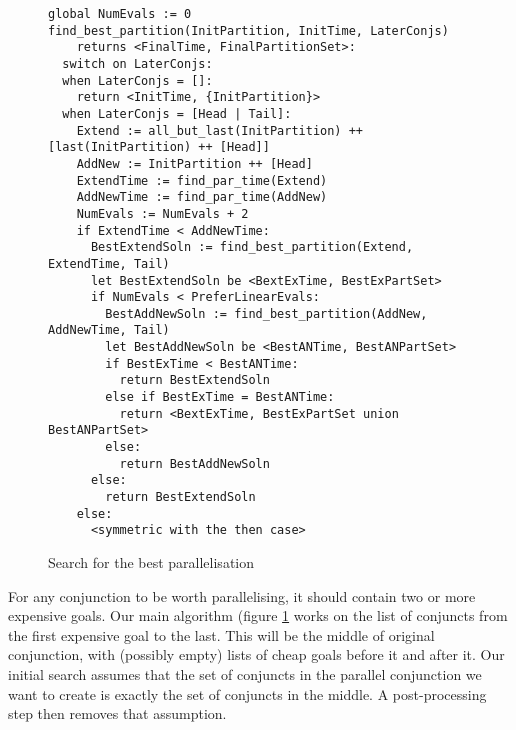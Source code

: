 \begin{figure}
\begin{center}
\begin{verbatim}
global NumEvals := 0
find_best_partition(InitPartition, InitTime, LaterConjs)
    returns <FinalTime, FinalPartitionSet>:
  switch on LaterConjs:
  when LaterConjs = []:
    return <InitTime, {InitPartition}>
  when LaterConjs = [Head | Tail]:
    Extend := all_but_last(InitPartition) ++ [last(InitPartition) ++ [Head]]
    AddNew := InitPartition ++ [Head]
    ExtendTime := find_par_time(Extend)
    AddNewTime := find_par_time(AddNew)
    NumEvals := NumEvals + 2
    if ExtendTime < AddNewTime:
      BestExtendSoln := find_best_partition(Extend, ExtendTime, Tail)
      let BestExtendSoln be <BextExTime, BestExPartSet>
      if NumEvals < PreferLinearEvals:
        BestAddNewSoln := find_best_partition(AddNew, AddNewTime, Tail)
        let BestAddNewSoln be <BestANTime, BestANPartSet>
        if BestExTime < BestANTime:
          return BestExtendSoln
        else if BestExTime = BestANTime:
          return <BextExTime, BestExPartSet union BestANPartSet>
        else:
          return BestAddNewSoln
      else:
        return BestExtendSoln
    else:
      <symmetric with the then case>
\end{verbatim}
\end{center}
\caption{Search for the best parallelisation}
\label{fig:best_par_search}
\end{figure}

For any conjunction to be worth parallelising,
it should contain two or more expensive goals.
Our main algorithm (figure \ref{fig:best_par_search} works on the list
of conjuncts
from the first expensive goal to the last.
This will be the middle of original conjunction,
with (possibly empty) lists of cheap goals before it and after it.
Our initial search assumes that
the set of conjuncts in the parallel conjunction we want to create
is exactly the set of conjuncts in the middle.
A post-processing step then removes that assumption.



